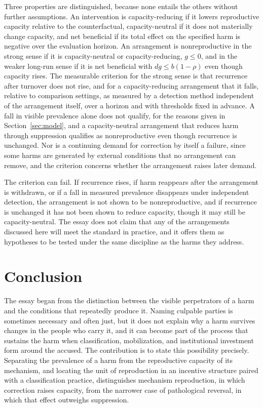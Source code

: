 \documentclass[12pt]{article}
\theoremstyle{remark}
\begin{document}
Three properties are distinguished, because none entails the others without further assumptions. An intervention is capacity-reducing if it lowers reproductive capacity relative to the counterfactual, capacity-neutral if it does not materially change capacity, and net beneficial if its total effect on the specified harm is negative over the evaluation horizon. An arrangement is nonreproductive in the strong sense if it is capacity-neutral or capacity-reducing, $g \le 0$, and in the weaker long-run sense if it is net beneficial with $dg \le b(1-\rho)$ even though capacity rises. The measurable criterion for the strong sense is that recurrence after turnover does not rise, and for a capacity-reducing arrangement that it falls, relative to comparison settings, as measured by a detection method independent of the arrangement itself, over a horizon and with thresholds fixed in advance. A fall in visible prevalence alone does not qualify, for the reasons given in Section~\ref{sec:model}, and a capacity-neutral arrangement that reduces harm through suppression qualifies as nonreproductive even though recurrence is unchanged. Nor is a continuing demand for correction by itself a failure, since some harms are generated by external conditions that no arrangement can remove, and the criterion concerns whether the arrangement raises later demand.

The criterion can fail. If recurrence rises, if harm reappears after the arrangement is withdrawn, or if a fall in measured prevalence disappears under independent detection, the arrangement is not shown to be nonreproductive, and if recurrence is unchanged it has not been shown to reduce capacity, though it may still be capacity-neutral. The essay does not claim that any of the arrangements discussed here will meet the standard in practice, and it offers them as hypotheses to be tested under the same discipline as the harms they address.

\section{Conclusion}
\label{sec:conclusion}

The essay began from the distinction between the visible perpetrators of a harm and the conditions that repeatedly produce it. Naming culpable parties is sometimes necessary and often just, but it does not explain why a harm survives changes in the people who carry it, and it can become part of the process that sustains the harm when classification, mobilization, and institutional investment form around the accused. The contribution is to state this possibility precisely. Separating the prevalence of a harm from the reproductive capacity of its mechanism, and locating the unit of reproduction in an incentive structure paired with a classification practice, distinguishes mechanism reproduction, in which correction raises capacity, from the narrower case of pathological reversal, in which that effect outweighs suppression.
\end{document}
